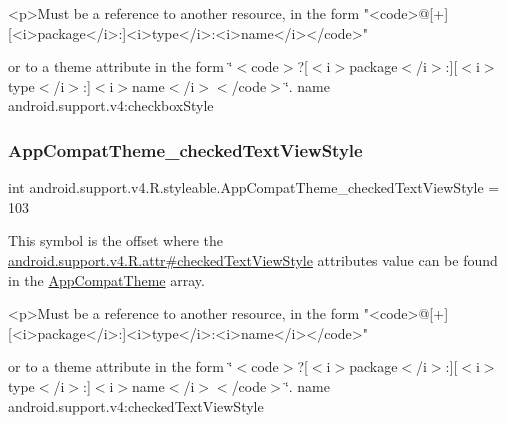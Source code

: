\begin{DoxyVerb}      <p>Must be a reference to another resource, in the form "<code>@[+][<i>package</i>:]<i>type</i>:<i>name</i></code>"
\end{DoxyVerb}
 or to a theme attribute in the form \char`\"{}$<$code$>$?\mbox{[}$<$i$>$package$<$/i$>$\+:\mbox{]}\mbox{[}$<$i$>$type$<$/i$>$\+:\mbox{]}$<$i$>$name$<$/i$>$$<$/code$>$\char`\"{}.  name android.\+support.\+v4\+:checkbox\+Style \mbox{\label{classandroid_1_1support_1_1v4_1_1R_1_1styleable_a62b92d2bf4651c1c6fe848d00c83ebe2}} 
\subsubsection{\texorpdfstring{App\+Compat\+Theme\+\_\+checked\+Text\+View\+Style}{AppCompatTheme\_checkedTextViewStyle}}
{\footnotesize\ttfamily int android.\+support.\+v4.\+R.\+styleable.\+App\+Compat\+Theme\+\_\+checked\+Text\+View\+Style = 103\hspace{0.3cm}{\ttfamily [static]}}

This symbol is the offset where the \hyperlink{classandroid_1_1support_1_1v4_1_1R_1_1attr_a1607a1060b69cce75845ca5e08c7a782}{android.\+support.\+v4.\+R.\+attr\#checked\+Text\+View\+Style} attribute\textquotesingle{}s value can be found in the \hyperlink{classandroid_1_1support_1_1v4_1_1R_1_1styleable_ac07ebbe62ed977f6dcaadc6397840ace}{App\+Compat\+Theme} array.

\begin{DoxyVerb}      <p>Must be a reference to another resource, in the form "<code>@[+][<i>package</i>:]<i>type</i>:<i>name</i></code>"
\end{DoxyVerb}
 or to a theme attribute in the form \char`\"{}$<$code$>$?\mbox{[}$<$i$>$package$<$/i$>$\+:\mbox{]}\mbox{[}$<$i$>$type$<$/i$>$\+:\mbox{]}$<$i$>$name$<$/i$>$$<$/code$>$\char`\"{}.  name android.\+support.\+v4\+:checked\+Text\+View\+Style \mbox{\label{classandroid_1_1support_1_1v4_1_1R_1_1styleable_a70404ad3a5e8a8979dec037058215d60}} 
